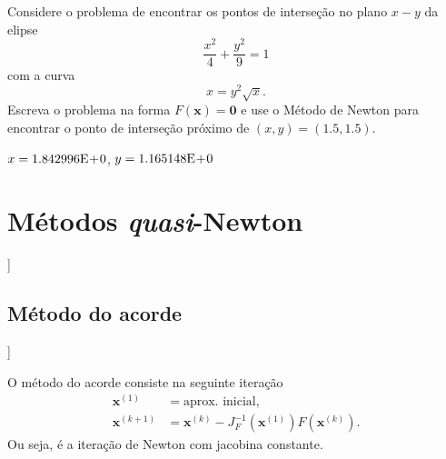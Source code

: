 \begin{exer}
  Considere o problema de encontrar os pontos de interseção no plano $x-y$ da elipse
  \begin{equation}
    \frac{x^2}{4} + \frac{y^2}{9} = 1
  \end{equation}
  com a curva
  \begin{equation}
    x = y^2\sqrt{x}.
  \end{equation}
  Escreva o problema na forma $F(\pmb{x}) = \pmb{0}$ e use o Método de Newton para encontrar o ponto de interseção próximo de $(x, y) = (1.5, 1.5)$.
\end{exer}
\begin{resp}
  $x = 1.842996\mathrm{E}\!+\!0$, $y = 1.165148\mathrm{E}\!+\!0$
\end{resp}

\section{Métodos {\it quasi}-Newton}\label{cap_snl_sec_quasi_newton}

\begin{flushleft}
  [[tag:revisar]]
\end{flushleft}

\subsection{Método do acorde}

\begin{flushleft}
  [[tag:revisar]]
\end{flushleft}

O método do acorde consiste na seguinte iteração
\begin{align}
  \pmb{x}^{(1)} &= \text{aprox. inicial},\\
  \pmb{x}^{(k+1)} &= \pmb{x}^{(k)} - J_F^{-1}(\pmb{x}^{(1)})F(\pmb{x}^{(k)}).
\end{align}
Ou seja, é a iteração de Newton com jacobina constante.

